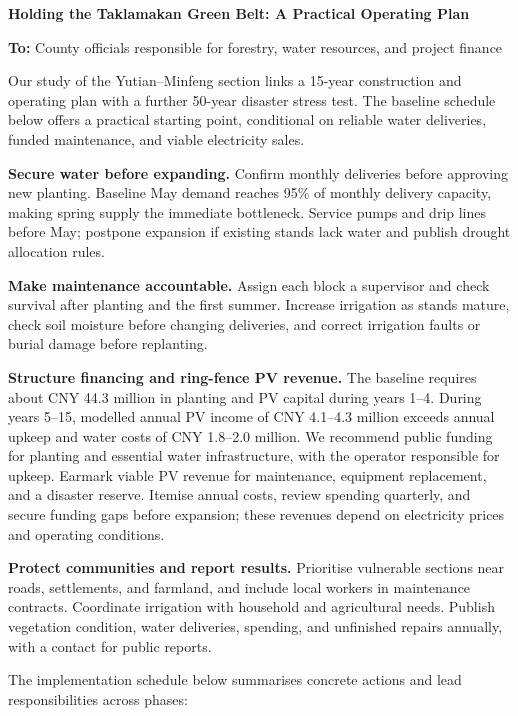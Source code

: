 \clearpage
\begingroup\small
\setlength{\parindent}{0pt}
\setlength{\parskip}{5pt}
{}
\label{sec:brief}
{\large\bfseries Holding the Taklamakan Green Belt: A Practical Operating Plan\par}
\vspace{3pt}
\textbf{To:} County officials responsible for forestry, water resources, and project finance\par
Our study of the Yutian--Minfeng section links a 15-year construction and operating plan with a further 50-year disaster stress test. The baseline schedule below offers a practical starting point, conditional on reliable water deliveries, funded maintenance, and viable electricity sales.\par
\textbf{Secure water before expanding.} Confirm monthly deliveries before approving new planting. Baseline May demand reaches 95\% of monthly delivery capacity, making spring supply the immediate bottleneck. Service pumps and drip lines before May; postpone expansion if existing stands lack water and publish drought allocation rules.\par
\textbf{Make maintenance accountable.} Assign each block a supervisor and check survival after planting and the first summer. Increase irrigation as stands mature, check soil moisture before changing deliveries, and correct irrigation faults or burial damage before replanting.\par
\textbf{Structure financing and ring-fence PV revenue.} The baseline requires about CNY 44.3 million in planting and PV capital during years 1--4. During years 5--15, modelled annual PV income of CNY 4.1--4.3 million exceeds annual upkeep and water costs of CNY 1.8--2.0 million. We recommend public funding for planting and essential water infrastructure, with the operator responsible for upkeep. Earmark viable PV revenue for maintenance, equipment replacement, and a disaster reserve. Itemise annual costs, review spending quarterly, and secure funding gaps before expansion; these revenues depend on electricity prices and operating conditions.\par
\textbf{Protect communities and report results.} Prioritise vulnerable sections near roads, settlements, and farmland, and include local workers in maintenance contracts. Coordinate irrigation with household and agricultural needs. Publish vegetation condition, water deliveries, spending, and unfinished repairs annually, with a contact for public reports.\par
The implementation schedule below summarises concrete actions and lead responsibilities across phases:


